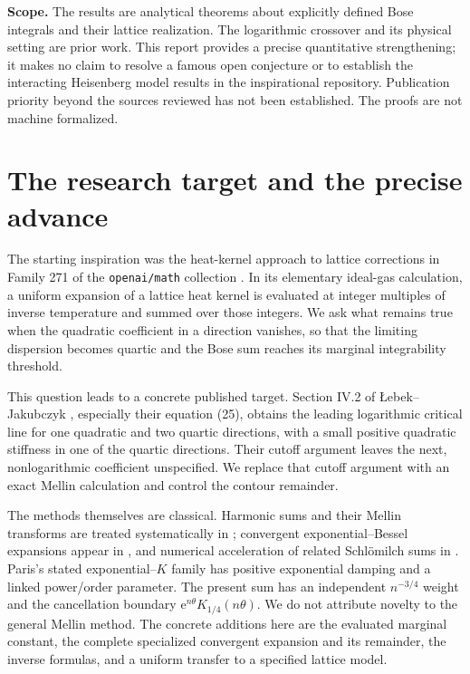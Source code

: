 \documentclass[11pt,a4paper]{article}
\numberwithin{equation}{section}
\theoremstyle{definition}
\newcommand{\e}{\mathrm e}
\begin{document}
\begin{titlepage}
\vfill
\noindent\small\color{muted}
\textbf{Scope.} The results are analytical theorems about explicitly defined
Bose integrals and their lattice realization. The logarithmic crossover
and its physical setting are prior work. This report provides a precise
quantitative strengthening; it makes no claim to resolve a famous open
conjecture or to establish the interacting Heisenberg model results in the
inspirational repository. Publication priority beyond the sources reviewed
has not been established. The proofs are not machine formalized.
\end{titlepage}
\hypersetup{pageanchor=true}

\tableofcontents
\clearpage

\section{The research target and the precise advance}
\label{sec:target}

The starting inspiration was the heat-kernel approach to lattice
corrections in Family 271 of the \texttt{openai/math} collection
\cite{OAIcatalog,OAIbloch}. In its elementary ideal-gas calculation, a
uniform expansion of a lattice heat kernel is evaluated at integer
multiples of inverse temperature and summed over those integers.
We ask what remains true when the quadratic coefficient in a direction
vanishes, so that the limiting dispersion becomes quartic and the Bose
sum reaches its marginal integrability threshold.

This question leads to a concrete published target. Section IV.2 of
Łebek--Jakubczyk \cite{LJ2020}, especially their equation (25), obtains the
leading logarithmic critical line for one quadratic and two quartic
directions, with a small positive quadratic stiffness in one of the
quartic directions. Their cutoff argument leaves the next, nonlogarithmic
coefficient unspecified. We replace that cutoff argument with an exact
Mellin calculation and control the contour remainder.

The methods themselves are classical. Harmonic sums and their Mellin
transforms are treated systematically in \cite{FGD1995}; convergent
exponential--Bessel expansions appear in \cite{Paris2020}, and numerical
acceleration of related Schlömilch sums in \cite{LintonBarnett2004}.
Paris's stated exponential--$K$ family has positive exponential damping
and a linked power/order parameter. The present sum has an independent
$n^{-3/4}$ weight and the cancellation boundary
$\e^{n\theta}K_{1/4}(n\theta)$. We do not attribute novelty to the general
Mellin method. The concrete additions here are the evaluated marginal
constant, the complete specialized convergent expansion and its
remainder, the inverse formulas, and a uniform transfer to a specified
lattice model.
\end{document}
